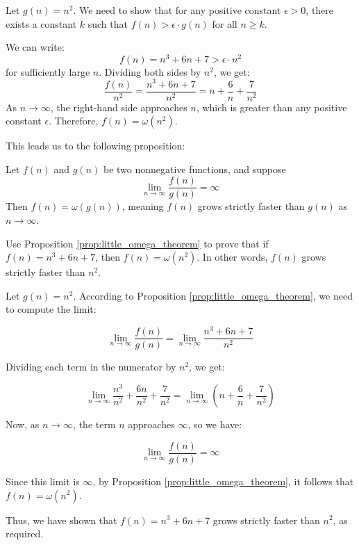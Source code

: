 \begin{solution}
    Let $g(n) = n^2$. We need to show that for any positive constant $\epsilon > 0$, there exists a constant $k$ such that $f(n) > \epsilon \cdot g(n)$ for all $n \geq k$.

    We can write:
    \[
    f(n) = n^3 + 6n + 7 > \epsilon \cdot n^2
    \]
    for sufficiently large $n$. Dividing both sides by $n^2$, we get:
    \[
    \frac{f(n)}{n^2} = \frac{n^3 + 6n + 7}{n^2} = n + \frac{6}{n} + \frac{7}{n^2}
    \]
    As $n \to \infty$, the right-hand side approaches $n$, which is greater than any positive constant $\epsilon$. Therefore, $f(n) = \omega(n^2)$.
\end{solution}

This leads us to the following proposition:

\begin{proposition} \label{prop:little_omega_theorem}
    Let \( f(n) \) and \( g(n) \) be two nonnegative functions, and suppose
    \medskip
    \[
    \lim_{n \rightarrow \infty} \frac{f(n)}{g(n)} = \infty
    \]
    \medskip
    Then \( f(n) = \omega(g(n)) \), meaning \( f(n) \) grows strictly faster than \( g(n) \) as \( n \to \infty \).
\end{proposition}

\begin{example}
    Use Proposition \ref{prop:little_omega_theorem} to prove that if \( f(n) = n^3 + 6n + 7 \), then \( f(n) = \omega(n^2) \). In other words, \( f(n) \) grows strictly faster than \( n^2 \).
\end{example}

\begin{solution}
    Let \( g(n) = n^2 \). According to Proposition \ref{prop:little_omega_theorem}, we need to compute the limit:
    
    \[
    \lim_{n \to \infty} \frac{f(n)}{g(n)} = \lim_{n \to \infty} \frac{n^3 + 6n + 7}{n^2}
    \]
    
    Dividing each term in the numerator by \( n^2 \), we get:
    
    \[
    \lim_{n \to \infty} \frac{n^3}{n^2} + \frac{6n}{n^2} + \frac{7}{n^2} = \lim_{n \to \infty} \left( n + \frac{6}{n} + \frac{7}{n^2} \right)
    \]
    
    Now, as \( n \to \infty \), the term \( n \) approaches \( \infty \), so we have:
    
    \[
    \lim_{n \to \infty} \frac{f(n)}{g(n)} = \infty
    \]
    
    Since this limit is \( \infty \), by Proposition \ref{prop:little_omega_theorem}, it follows that \( f(n) = \omega(n^2) \).
    
    Thus, we have shown that \( f(n) = n^3 + 6n + 7 \) grows strictly faster than \( n^2 \), as required.
\end{solution}

